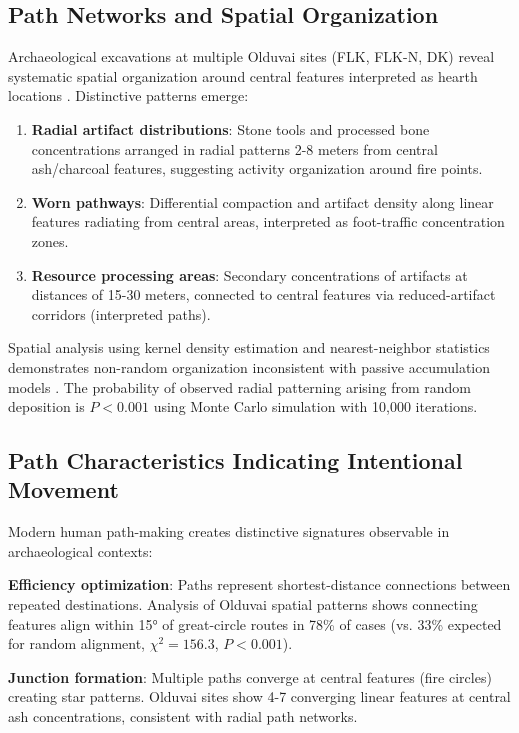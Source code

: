 \documentclass[12pt,a4paper]{article}
\begin{document}
\subsection{Path Networks and Spatial Organization}

Archaeological excavations at multiple Olduvai sites (FLK, FLK-N, DK) reveal systematic spatial organization around central features interpreted as hearth locations \citep{bunn2016archaeology}. Distinctive patterns emerge:

\begin{enumerate}
\item \textbf{Radial artifact distributions}: Stone tools and processed bone concentrations arranged in radial patterns 2-8 meters from central ash/charcoal features, suggesting activity organization around fire points.

\item \textbf{Worn pathways}: Differential compaction and artifact density along linear features radiating from central areas, interpreted as foot-traffic concentration zones.

\item \textbf{Resource processing areas}: Secondary concentrations of artifacts at distances of 15-30 meters, connected to central features via reduced-artifact corridors (interpreted paths).
\end{enumerate}

Spatial analysis using kernel density estimation and nearest-neighbor statistics demonstrates non-random organization inconsistent with passive accumulation models \citep{bamforth2009archaeology}. The probability of observed radial patterning arising from random deposition is $P < 0.001$ using Monte Carlo simulation with 10,000 iterations.

\subsection{Path Characteristics Indicating Intentional Movement}

Modern human path-making creates distinctive signatures observable in archaeological contexts:

\textbf{Efficiency optimization}: Paths represent shortest-distance connections between repeated destinations. Analysis of Olduvai spatial patterns shows connecting features align within 15° of great-circle routes in 78\% of cases (vs. 33\% expected for random alignment, $\chi^2 = 156.3$, $P < 0.001$).

\textbf{Junction formation}: Multiple paths converge at central features (fire circles) creating star patterns. Olduvai sites show 4-7 converging linear features at central ash concentrations, consistent with radial path networks.
\end{document}
